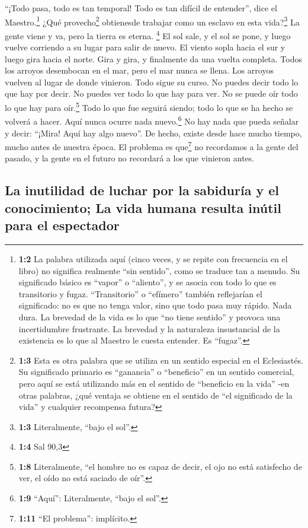  ``¡Todo pasa, todo es tan temporal! Todo es tan difícil
de entender'', dice el Maestro.\footnote{\textbf{1:2} La palabra
  utilizada aquí (cinco veces, y se repite con frecuencia en el libro)
  no significa realmente ``sin sentido'', como se traduce tan a menudo.
  Su significado básico es ``vapor'' o ``aliento'', y se asocia con todo
  lo que es transitorio y fugaz. ``Transitorio'' o ``efímero'' también
  reflejarían el significado: no es que no tenga valor, sino que todo
  pasa muy rápido. Nada dura. La brevedad de la vida es lo que ``no
  tiene sentido'' y provoca una incertidumbre frustrante. La brevedad y
  la naturaleza insustancial de la existencia es lo que al Maestro le
  cuesta entender. Es ``fugaz''.}  ¿Qué
provecho\footnote{\textbf{1:3} Esta es otra palabra que se utiliza en un
  sentido especial en el Eclesiastés. Su significado primario es
  ``ganancia'' o ``beneficio'' en un sentido comercial, pero aquí se
  está utilizando más en el sentido de ``beneficio en la vida'' -en
  otras palabras, ¿qué ventaja se obtiene en el sentido de ``el
  significado de la vida'' y cualquier recompensa futura?} obtienesde
trabajar como un esclavo en esta vida?\footnote{\textbf{1:3}
  Literalmente, ``bajo el sol''.}  La gente viene y va,
pero la tierra es eterna. \footnote{\textbf{1:4} Sal 90,3}
 El sol sale, y el sol se pone, y luego vuelve corriendo a
su lugar para salir de nuevo.  El viento sopla hacia el
sur y luego gira hacia el norte. Gira y gira, y finalmente da una vuelta
completa.  Todos los arroyos desembocan en el mar, pero el
mar nunca se llena. Los arroyos vuelven al lugar de donde vinieron.
 Todo sigue su curso. No puedes decir todo lo que hay por
decir. No puedes ver todo lo que hay para ver. No se puede oír todo lo
que hay para oír.\footnote{\textbf{1:8} Literalmente, ``el hombre no es
  capaz de decir, el ojo no está satisfecho de ver, el oído no está
  saciado de oír''.}  Todo lo que fue seguirá siendo; todo
lo que se ha hecho se volverá a hacer. Aquí nunca ocurre nada
nuevo.\footnote{\textbf{1:9} ``Aquí'': Literalmente, ``bajo el sol''.}
 No hay nada que pueda señalar y decir: ``¡Mira! Aquí hay
algo nuevo''. De hecho, existe desde hace mucho tiempo, mucho antes de
nuestra época.  El problema es que\footnote{\textbf{1:11}
  ``El problema'': implícito.} no recordamos a la gente del pasado, y la
gente en el futuro no recordará a los que vinieron antes.

\hypertarget{la-inutilidad-de-luchar-por-la-sabiduruxeda-y-el-conocimiento-la-vida-humana-resulta-inuxfatil-para-el-espectador}{%
\subsection{La inutilidad de luchar por la sabiduría y el conocimiento;
La vida humana resulta inútil para el
espectador}\label{la-inutilidad-de-luchar-por-la-sabiduruxeda-y-el-conocimiento-la-vida-humana-resulta-inuxfatil-para-el-espectador}}

